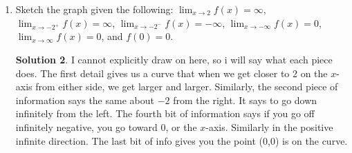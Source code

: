 \documentclass[10pt]{article}
\newcommand{\ds}{\displaystyle}
\theoremstyle{Theorem}
\theoremstyle{definition}
\newtheorem*{solution}{Solution}
\theoremstyle{remark}
\theoremstyle{custom}
\begin{document}
\begin{enumerate}[1.]
\begin{enumerate}[a.]
\begin{solution}
\end{solution}
\end{enumerate}
\item Sketch the graph given the following: $\ds\lim_{x\rightarrow 2}f(x)=\infty$, $\ds\lim_{x\rightarrow-2^+}f(x)=\infty$, $\ds\lim_{x\rightarrow-2^-}f(x)=-\infty$, $\ds\lim_{x\rightarrow-\infty}f(x)=0$, $\ds\lim_{x\rightarrow\infty}f(x)=0$, and $f(0)=0$.
\begin{solution}
I cannot explicitly draw on here, so i will say what each piece does. The first detail gives us a curve that when we get closer to 2 on the $x$-axis from either side, we get larger and larger. Similarly, the second piece of information says the same about $-2$ from the right. It says to go down infinitely from the left. The fourth bit of information says if you go off infinitely negative, you go toward 0, or the $x$-axis. Similarly in the positive infinite direction. The last bit of info gives you the point (0,0) is on the curve.
\end{solution}
\end{enumerate}
\end{document}
